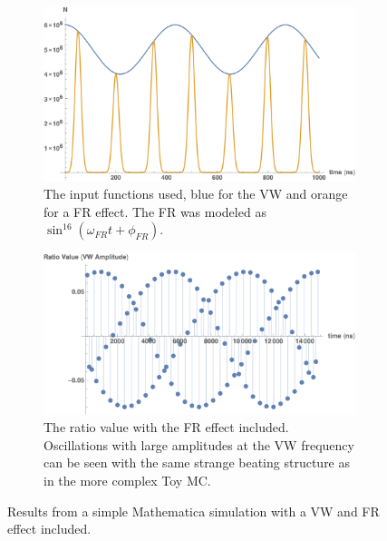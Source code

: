 \documentclass[12pt,letterpaper]{article}
\begin{document}
\begin{figure}[]
\centering
    \begin{subfigure}[t]{0.7\textwidth}
        \centering
        \includegraphics[width=\textwidth]{MathematicaMC_functionExample}
        \caption{The input functions used, blue for the VW and orange for a FR effect. The FR was modeled as $\sin^{16}(\omega_{FR}t + \phi_{FR})$.}
    \end{subfigure}%
    \vspace{1cm}
    \begin{subfigure}[t]{0.7\textwidth}
        \centering
        \includegraphics[width=\textwidth]{MathematicaMC_withFR}
        \caption{The ratio value with the FR effect included. Oscillations with large amplitudes at the VW frequency can be seen with the same strange beating structure as in the more complex Toy MC.}
    \end{subfigure}
\caption[]{Results from a simple Mathematica simulation with a VW and FR effect included.}
\label{fig:MathematicaMC_VW_FR}
\end{figure}
\end{document}
